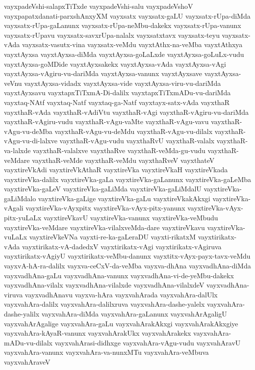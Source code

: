 {vayxpadeVshi-salapxTiTxde
vayxpadeVshi-salu
vayxpadeVshoV
vayxpapatxdanati-parxshAnxyXM
vayxsatx
vayxsatx-gaLU
vayxsatx-rUpa-diMda
vayxsatx-rUpa-gaLanunx
vayxsatx-rUpa-neMbu-dakekx
vayxsatx-rUpa-vanunx
vayxsatx-rUpavu
vayxsatx-savxrUpa-nalalx
vayxsatxtavx
vayxsatx-teyu
vayxsatx-vAda
vayxsatx-vasutx-vina
vayxsatx-veMdu
vayxtAthx-na-veMba
vayxtAthxya
vayxtAyxsa
vayxtAyxsa-diMda
vayxtAyxsa-goLaLxde
vayxtAyxsa-goLuLx-vudu
vayxtAyxsa-goMDide
vayxtAyxsakekx
vayxtAyxsa-vAda
vayxtAyxsa-vAgi
vayxtAyxsa-vAgiru-vu-dariMda
vayxtAyxsa-vanunx
vayxtAyxsave
vayxtAyxsa-veVnu
vayxtAyxsa-vidadx
vayxtAyxsa-vide
vayxtAyxsa-viru-vu-dariMda
vayxtAyxsavu
vayxtapxTiTxmA-Di-dalilx
vayxtapxTiTxmADu-vu-dariMda
vayxtaq-NAtf
vayxtaq-Natf
vayxtaq-ga-Natf
vayxtayx-satx-vAda
vayxthaR
vayxthaR-vAda
vayxthaR-vAdiVtu
vayxthaR-vAgi
vayxthaR-vAgiru-vu-dariMda
vayxthaR-vAgiru-vudu
vayxthaR-vAgu-vaMte
vayxthaR-vAgu-vavu
vayxthaR-vAgu-vu-deMba
vayxthaR-vAgu-vu-deMdu
vayxthaR-vAgu-vu-dilalx
vayxthaR-vAgu-vu-di-lalxve
vayxthaR-vAgu-vudu
vayxthaRvU
vayxthaR-valalx
vayxthaR-va-lalxde
vayxthaR-valalxve
vayxthaRve
vayxthaR-veMda-gu-vudu
vayxthaR-veMdare
vayxthaR-veMde
vayxthaR-veMdu
vayxthaRveV
vayxthateV
vayxtireVkAdi
vayxtireVkAthaR
vayxtireVka
vayxtireVkaH
vayxtireVkada
vayxtireVka-dalilx
vayxtireVka-gaLa
vayxtireVka-gaLanunx
vayxtireVka-gaLeMba
vayxtireVka-gaLeV
vayxtireVka-gaLiMda
vayxtireVka-gaLiMdalU
vayxtireVka-gaLiMdalo
vayxtireVka-gaLige
vayxtireVka-gaLu
vayxtireVkakAkxgi
vayxtireVka-vAgali
vayxtireVka-vAyxpitx
vayxtireVka-vAyx-pitx-yanunx
vayxtireVka-vAyx-pitx-yuLaLx
vayxtireVkavU
vayxtireVka-vanunx
vayxtireVka-veMbudu
vayxtireVka-veMdare
vayxtireVka-vilalxveMda-dare
vayxtireVkavu
vayxtireVka-vuLaLx
vayxtireVkeVNa
vayxti-re-ka-gaLeraDU
vayxti-rikatxM
vayxtirikatx-vAda
vayxtirikatx-vA-dadedxV
vayxtirikatx-vAgi
vayxtirikatx-vAgiruva
vayxtirikatx-vAgiyU
vayxtirikatx-veMbu-danunx
vayxtitx-vAyx-payx-tavx-veMdu
vayxvA-hA-ra-dalilx
vayxva-ceCxV-da-veMba
vayxva-dhAna
vayxvadhAna-diMda
vayxvadhAna-gaLu
vayxvadhAna-vanunx
vayxvadhAna-vi-de-yeMbu-dakekx
vayxvadhAna-vilalx
vayxvadhAna-vilalxde
vayxvadhAna-vilalxdeV
vayxvadhAna-viruva
vayxvadhAnavu
vayxva-hAra
vayxvahArada
vayxvahAra-dalUlx
vayxvahAra-dalilx
vayxvahAra-dalilxruva
vayxvahAra-dashe-yalelx
vayxvahAra-dashe-yalilx
vayxvahAra-diMda
vayxvahAra-gaLanunx
vayxvahArAgaligU
vayxvahArAgalige
vayxvahAra-gaLu
vayxvahArakAkxgi
vayxvahArakAkxgiye
vayxvahAra-kAyaR-vanunx
vayxvahArakUkx
vayxvahArakekx
vayxvahAra-mADu-vu-dilalx
vayxvahArasi-didhxge
vayxvahAra-vAgu-vudu
vayxvahAravU
vayxvahAra-vanunx
vayxvahAra-va-nunxMTu
vayxvahAra-veMbuva
vayxvahAraveV
}
